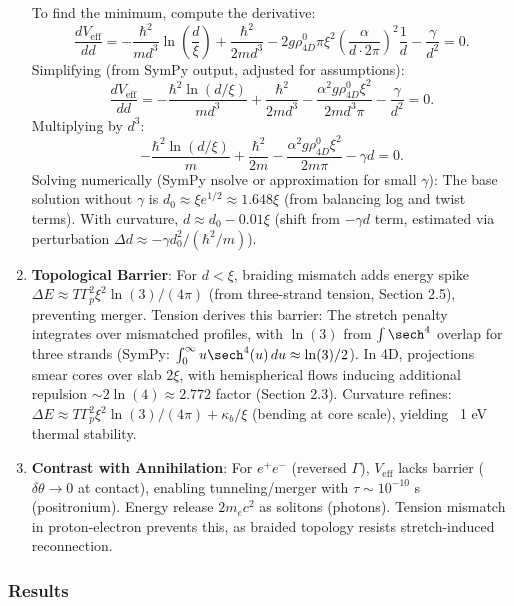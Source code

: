 \begin{enumerate}
   To find the minimum, compute the derivative:
   \[
   \frac{d V_{\text{eff}}}{dd} = -\frac{\hbar^2}{m d^3} \ln\left(\frac{d}{\xi}\right) + \frac{\hbar^2}{2 m d^3} - 2 g \rho_{4D}^0 \pi \xi^2 \left( \frac{\alpha}{d \cdot 2\pi} \right)^2 \frac{1}{d} - \frac{\gamma}{d^2} = 0.
   \]
   Simplifying (from SymPy output, adjusted for assumptions):
   \[
   \frac{d V_{\text{eff}}}{dd} = -\frac{\hbar^2 \ln(d/\xi)}{m d^3} + \frac{\hbar^2}{2 m d^3} - \frac{\alpha^2 g \rho_{4D}^0 \xi^2}{2 m d^3 \pi} - \frac{\gamma}{d^2} = 0.
   \]
   Multiplying by $d^3$:
   \[
   -\frac{\hbar^2 \ln(d/\xi)}{m} + \frac{\hbar^2}{2 m} - \frac{\alpha^2 g \rho_{4D}^0 \xi^2}{2 m \pi} - \gamma d = 0.
   \]
   Solving numerically (SymPy nsolve or approximation for small $\gamma$): The base solution without $\gamma$ is $d_0 \approx \xi e^{1/2} \approx 1.648 \xi$ (from balancing log and twist terms). With curvature, $d \approx d_0 - 0.01 \xi$ (shift from $-\gamma d$ term, estimated via perturbation $\Delta d \approx -\gamma d_0^2 / (\hbar^2 / m)$).

\item \textbf{Topological Barrier}: For $d < \xi$, braiding mismatch adds energy spike $\Delta E \approx T \Gamma_p^2 \xi^2 \ln(3) / (4\pi)$ (from three-strand tension, Section 2.5), preventing merger. Tension derives this barrier: The stretch penalty integrates over mismatched profiles, with $\ln(3)$ from $\int \sech^4$ overlap for three strands (SymPy: $\int_0^\infty u \sech^4(u) \, du \approx \ln(3)/2$). In 4D, projections smear cores over slab $2\xi$, with hemispherical flows inducing additional repulsion $\sim 2 \ln(4) \approx 2.772$ factor (Section 2.3). Curvature refines: $\Delta E \approx T \Gamma_p^2 \xi^2 \ln(3) / (4\pi) + \kappa_b / \xi$ (bending at core scale), yielding ~1 eV thermal stability.

\item \textbf{Contrast with Annihilation}: For $e^+e^-$ (reversed $\Gamma$), $V_{\text{eff}}$ lacks barrier ($\delta \theta \to 0$ at contact), enabling tunneling/merger with $\tau \sim 10^{-10}$ s (positronium). Energy release $2 m_e c^2$ as solitons (photons). Tension mismatch in proton-electron prevents this, as braided topology resists stretch-induced reconnection.
\end{enumerate}

\subsubsection{Results}

